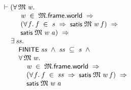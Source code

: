 \documentclass[letterpaper]{article}
\renewcommand{\HOLConst}[1]{{\textsf{\upshape\small #1}}}
\newenvironment{holmath}{\begin{displaymath}\begin{array}{l}}{\end{array}\end{displaymath}\ignorespacesafterend}
\begin{document}
\begin{holmath}
  \ensuremath{\HOLTokenTurnstile}(\HOLSymConst{\HOLTokenForall{}}\HOLBoundVar{\ensuremath{\mathfrak{M}}}\;\HOLBoundVar{w}.\\
\;\;\;\;\;\;\;\;\;\;\HOLBoundVar{w}\;\HOLSymConst{\HOLTokenIn{}}\;\HOLBoundVar{\ensuremath{\mathfrak{M}}}.\HOLFieldName{frame}.\HOLFieldName{world}\;\HOLSymConst{\HOLTokenImp{}}\\
\;\;\;\;\;\;\;\;\;\;(\HOLSymConst{\HOLTokenForall{}}\HOLBoundVar{f}.\;\HOLBoundVar{f}\;\HOLSymConst{\HOLTokenIn{}}\;\HOLFreeVar{s}\;\HOLSymConst{\HOLTokenImp{}}\;\HOLConst{satis}\;\HOLBoundVar{\ensuremath{\mathfrak{M}}}\;\HOLBoundVar{w}\;\HOLBoundVar{f})\;\HOLSymConst{\HOLTokenImp{}}\\
\;\;\;\;\;\;\;\;\;\;\HOLConst{satis}\;\HOLBoundVar{\ensuremath{\mathfrak{M}}}\;\HOLBoundVar{w}\;\HOLFreeVar{a})\;\HOLSymConst{\HOLTokenImp{}}\\
\;\;\;\;\;\HOLSymConst{\HOLTokenExists{}}\HOLBoundVar{ss}.\\
\;\;\;\;\;\;\;\;\;\HOLConst{FINITE}\;\HOLBoundVar{ss}\;\HOLSymConst{\HOLTokenConj{}}\;\HOLBoundVar{ss}\;\HOLSymConst{\HOLTokenSubset{}}\;\HOLFreeVar{s}\;\HOLSymConst{\HOLTokenConj{}}\\
\;\;\;\;\;\;\;\;\;\HOLSymConst{\HOLTokenForall{}}\HOLBoundVar{\ensuremath{\mathfrak{M}}}\;\HOLBoundVar{w}.\\
\;\;\;\;\;\;\;\;\;\;\;\;\;\HOLBoundVar{w}\;\HOLSymConst{\HOLTokenIn{}}\;\HOLBoundVar{\ensuremath{\mathfrak{M}}}.\HOLFieldName{frame}.\HOLFieldName{world}\;\HOLSymConst{\HOLTokenImp{}}\\
\;\;\;\;\;\;\;\;\;\;\;\;\;(\HOLSymConst{\HOLTokenForall{}}\HOLBoundVar{f}.\;\HOLBoundVar{f}\;\HOLSymConst{\HOLTokenIn{}}\;\HOLBoundVar{ss}\;\HOLSymConst{\HOLTokenImp{}}\;\HOLConst{satis}\;\HOLBoundVar{\ensuremath{\mathfrak{M}}}\;\HOLBoundVar{w}\;\HOLBoundVar{f})\;\HOLSymConst{\HOLTokenImp{}}\\
\;\;\;\;\;\;\;\;\;\;\;\;\;\HOLConst{satis}\;\HOLBoundVar{\ensuremath{\mathfrak{M}}}\;\HOLBoundVar{w}\;\HOLFreeVar{a}
\end{holmath}
\end{document}

